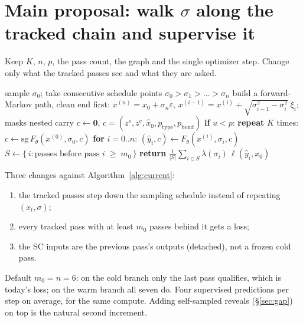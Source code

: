 \documentclass[11pt,a4paper]{article}
\newcommand{\zs}{z^{s}}
\newcommand{\ze}{z^{e}}
\newcommand{\xh}{\hat{x}_0}
\newcommand{\sg}{\mathrm{sg}}
\begin{document}
\section{Main proposal: walk $\sigma$ along the tracked chain and supervise it}\label{sec:main}

Keep $K$, $n$, $p$, the pass count, the graph and the single optimizer step. Change
only what the tracked passes see and what they are asked.

\begin{algorithm}[h]
\caption{Proposed training step}\label{alg:traj}
\begin{algorithmic}[1]
  \State sample $\sigma_0$; take consecutive schedule points $\sigma_0>\sigma_1>\dots>\sigma_n$
  \State build a forward-Markov path, clean end first:
         $x^{(n)} = x_0+\sigma_n\varepsilon$,\;
         $x^{(i-1)} = x^{(i)} + \sqrt{\sigma_{i-1}^2-\sigma_i^2}\;\xi_i$;\; masks nested
  \State carry $c \gets \mathbf 0$, \quad $c = (\zs,\ze,\xh,p_{\text{type}},p_{\text{bond}})$
  \State \textbf{if} $u<p$: \textbf{repeat} $K$ times: $c \gets \sg\,F_\theta(x^{(0)},\sigma_0,c)$ 
  \State \textbf{for} $i=0..n$: $(\hat y_i, c) \gets F_\theta(x^{(i)},\sigma_i,c)$ 
  \State $S \gets \{\, i : \text{passes before pass } i \;\ge\; m_0 \,\}$ 
  \State \textbf{return} $\tfrac{1}{|S|}\sum_{i\in S}\lambda(\sigma_i)\,\ell(\hat y_i,x_0)$
\end{algorithmic}
\end{algorithm}

Three changes against Algorithm~\ref{alg:current}:
\begin{enumerate}[label=(\alph*)]
  \item the tracked passes step down the sampling schedule instead of repeating $(x_t,\sigma)$;
  \item every tracked pass with at least $m_0$ passes behind it gets a loss;
  \item the SC inputs are the previous pass's outputs (detached), not a frozen cold pass.
\end{enumerate}
Default $m_0 = n = 6$: on the cold branch only the last pass qualifies, which is today's
loss; on the warm branch all seven do. Four supervised predictions per step on average,
for the same compute. Adding self-sampled reveals (\S\ref{sec:gap}) on top is the
natural second increment.
\end{document}
